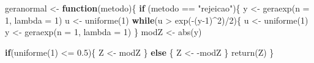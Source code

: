 \documentclass[
]{article}
\newenvironment{Shaded}{\begin{snugshade}}{\end{snugshade}}
\newcommand{\AttributeTok}[1]{\textcolor[rgb]{0.77,0.63,0.00}{#1}}
\newcommand{\ControlFlowTok}[1]{\textcolor[rgb]{0.13,0.29,0.53}{\textbf{#1}}}
\newcommand{\DecValTok}[1]{\textcolor[rgb]{0.00,0.00,0.81}{#1}}
\newcommand{\FloatTok}[1]{\textcolor[rgb]{0.00,0.00,0.81}{#1}}
\newcommand{\FunctionTok}[1]{\textcolor[rgb]{0.00,0.00,0.00}{#1}}
\newcommand{\NormalTok}[1]{#1}
\newcommand{\OtherTok}[1]{\textcolor[rgb]{0.56,0.35,0.01}{#1}}
\newcommand{\SpecialCharTok}[1]{\textcolor[rgb]{0.00,0.00,0.00}{#1}}
\newcommand{\StringTok}[1]{\textcolor[rgb]{0.31,0.60,0.02}{#1}}
\begin{document}
\begin{Shaded}
\begin{Highlighting}[]
\NormalTok{geranormal }\OtherTok{\textless{}{-}} \ControlFlowTok{function}\NormalTok{(metodo)\{}
  \ControlFlowTok{if}\NormalTok{ (metodo }\SpecialCharTok{==} \StringTok{"rejeicao"}\NormalTok{)\{}
\NormalTok{    y }\OtherTok{\textless{}{-}} \FunctionTok{geraexp}\NormalTok{(}\AttributeTok{n =} \DecValTok{1}\NormalTok{, }\AttributeTok{lambda =} \DecValTok{1}\NormalTok{)}
\NormalTok{    u }\OtherTok{\textless{}{-}} \FunctionTok{uniforme}\NormalTok{(}\DecValTok{1}\NormalTok{)}
    \ControlFlowTok{while}\NormalTok{(u }\SpecialCharTok{\textgreater{}} \FunctionTok{exp}\NormalTok{(}\SpecialCharTok{{-}}\NormalTok{(y}\DecValTok{{-}1}\NormalTok{)}\SpecialCharTok{\^{}}\DecValTok{2}\NormalTok{)}\SpecialCharTok{/}\DecValTok{2}\NormalTok{)\{}
\NormalTok{      u }\OtherTok{\textless{}{-}} \FunctionTok{uniforme}\NormalTok{(}\DecValTok{1}\NormalTok{)}
\NormalTok{      y }\OtherTok{\textless{}{-}} \FunctionTok{geraexp}\NormalTok{(}\AttributeTok{n =} \DecValTok{1}\NormalTok{, }\AttributeTok{lambda =} \DecValTok{1}\NormalTok{)}
\NormalTok{    \}}
\NormalTok{    modZ }\OtherTok{\textless{}{-}} \FunctionTok{abs}\NormalTok{(y)}
    
    \ControlFlowTok{if}\NormalTok{(}\FunctionTok{uniforme}\NormalTok{(}\DecValTok{1}\NormalTok{) }\SpecialCharTok{\textless{}=} \FloatTok{0.5}\NormalTok{)\{}
\NormalTok{      Z }\OtherTok{\textless{}{-}}\NormalTok{ modZ}
\NormalTok{    \} }\ControlFlowTok{else}\NormalTok{ \{}
\NormalTok{      Z }\OtherTok{\textless{}{-}} \SpecialCharTok{{-}}\NormalTok{modZ}
\NormalTok{    \}}
    \FunctionTok{return}\NormalTok{(Z)}
\NormalTok{  \}}
  

\end{Highlighting}
\end{Shaded}
\end{document}
